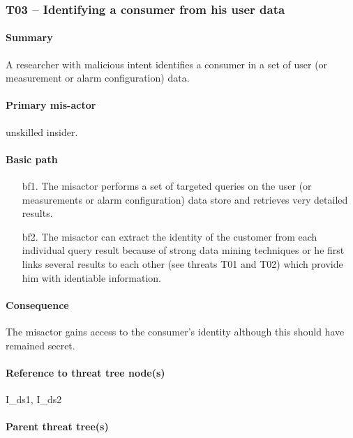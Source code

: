 \subsubsection{T03 -- Identifying a consumer from his user data}
\label{threats:t03}

\paragraph{Summary}

\npar A researcher with malicious intent identifies a consumer in a set of user
(or measurement or alarm configuration) data.

\paragraph{Primary mis-actor}

\npar unskilled insider.

\paragraph{Basic path}
\begin{enumerate}
	\item[bf1.] The misactor performs a set of targeted queries on the user
	(or measurements or alarm configuration) data store and retrieves very detailed
	results.
    \item[bf2.] The misactor can extract the identity of the customer from each
    individual query result because of strong data mining techniques or he first
    links several results to each other (see threats T01 and T02) which provide
    him with identiable information.
\end{enumerate}

\paragraph{Consequence}

\npar The misactor gains access to the consumer's identity although this should
have remained secret.

\paragraph{Reference to threat tree node(s)}

I\_ds1, I\_ds2

\paragraph{Parent threat tree(s)}

